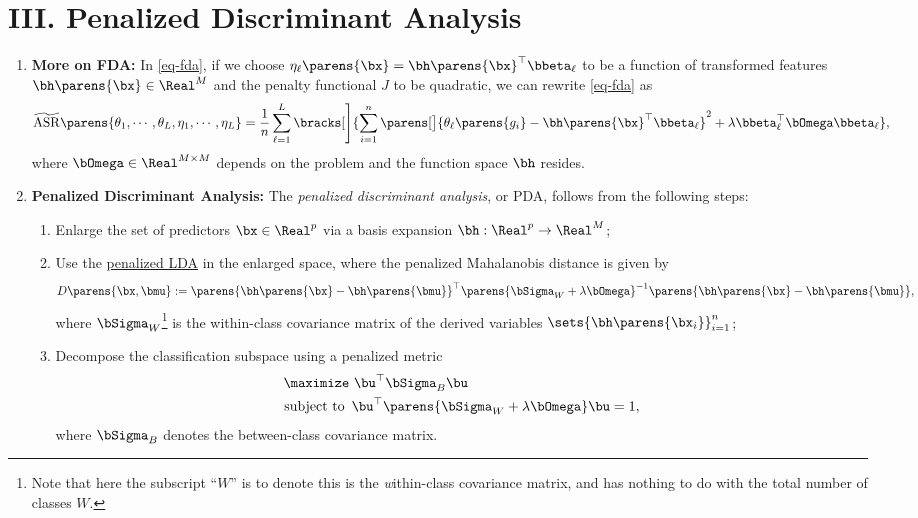 \documentclass[12pt]{article}
\begin{document}
\section*{III. Penalized Discriminant Analysis}

\begin{enumerate}[label=\textbf{\arabic*.}]

	\item \textbf{More on FDA:} In \eqref{eq-fda}, if we choose $\eta_{\ell} \parens{\bx} = \bh \parens{\bx}^\top \bbeta_{\ell}$ to be a function of transformed features $\bh \parens{\bx} \in \Real^M$ and the penalty functional $J$ to be quadratic, we can rewrite \eqref{eq-fda} as 
	\begin{align}\label{eq-fda-2}
		\widetilde{\mathrm{ASR}} \parens{\theta_1, \cdots, \theta_L, \eta_1, \cdots, \eta_L} = \frac{1}{n} \sum_{\ell=1}^L \bracks[\Bigg]{\sum_{i=1}^n \parens[\big]{\theta_{\ell} \parens{g_i} - \bh \parens{\bx}^\top \bbeta_{\ell}}^2 + \lambda \bbeta_{\ell}^\top \bOmega \bbeta_{\ell}}, 
	\end{align}
	where $\bOmega \in \Real^{M \times M}$ depends on the problem and the function space $\bh$ resides. 

	\item \textbf{Penalized Discriminant Analysis:} The \emph{penalized discriminant analysis}, or PDA, follows from the following steps: 
	\begin{enumerate}
		\item Enlarge the set of predictors $\bx \in \Real^p$ via a basis expansion $\bh: \Real^p \to \Real^M$; 
		\item Use the \underline{penalized LDA} in the enlarged space, where the penalized Mahalanobis distance is given by 
		\begin{align*}
			D \parens{\bx, \bmu} := \parens{ \bh \parens{\bx} - \bh \parens{\bmu}}^\top \parens{\bSigma_W + \lambda \bOmega}^{-1} \parens{\bh \parens{\bx} - \bh \parens{\bmu}}, 
		\end{align*}
		where $\bSigma_W$\footnote{Note that here the subscript ``$W$'' is to denote this is the \emph{w}ithin-class covariance matrix, and has nothing to do with the total number of classes $W$.} is the within-class covariance matrix of the derived variables $\sets{\bh \parens{\bx_i}}_{i=1}^n$; 
		\item Decompose the classification subspace using a penalized metric 
		\begin{equation*}
			\begin{aligned}
				\maximize & \ \bu^\top \bSigma_{B} \bu \\ 
				\text{subject to } & \, \bu^\top \parens{\bSigma_W + \lambda \bOmega} \bu = 1, 
			\end{aligned}
		\end{equation*}
		where $\bSigma_B$ denotes the between-class covariance matrix. 
		
	\end{enumerate}

\end{enumerate}
\end{document}
